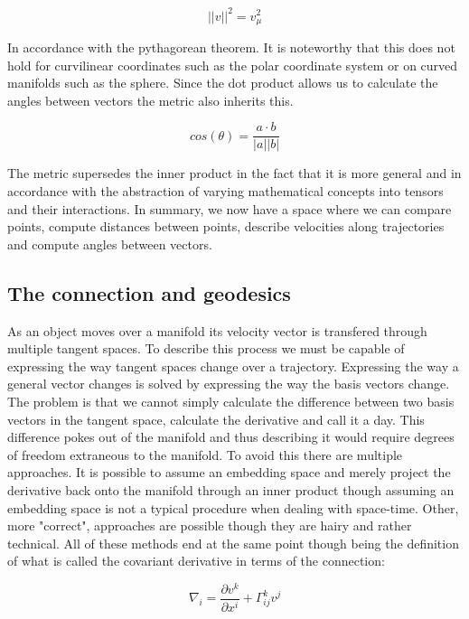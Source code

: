 \documentclass{article}
\begin{document}
\begin{equation*}
  ||v||^2 = v_\mu^2
\end{equation*}

In accordance with the pythagorean theorem. It is noteworthy that this does not hold for curvilinear coordinates such as the polar coordinate system or on curved manifolds such as the sphere. Since the dot product allows us to calculate the angles between vectors the metric also inherits this. 

\begin{equation*}
  cos(\theta) = \frac{a \cdot b}{|a||b|}
\end{equation*}

The metric supersedes the inner product in the fact that it is more general and in accordance with the abstraction of varying mathematical concepts into tensors and their interactions. In summary, we now have a space where we can compare points, compute distances between points, describe velocities along trajectories and compute angles between vectors.

\subsection{The connection and geodesics}

As an object moves over a manifold its velocity vector is transfered through multiple tangent spaces. To describe this process we must be capable of expressing the way tangent spaces change over a trajectory. Expressing the way a general vector changes is solved by expressing the way the basis vectors change. The problem is that we cannot simply calculate the difference between two basis vectors in the tangent space, calculate the derivative and call it a day. This difference pokes out of the manifold and thus describing it would require degrees of freedom extraneous to the manifold. To avoid this there are multiple approaches. It is possible to assume an embedding space and merely project the derivative back onto the manifold through an inner product though assuming an embedding space is not a typical procedure when dealing with space-time. Other, more "correct", approaches are possible though they are hairy and rather technical. All of these methods end at the same point though being the definition of what is called the covariant derivative in terms of the connection:

\begin{equation*}
  \nabla_i = \frac{\partial v^k}{\partial x^i} + \Gamma^k_ {ij} v^j
\end{equation*}
\end{document}
